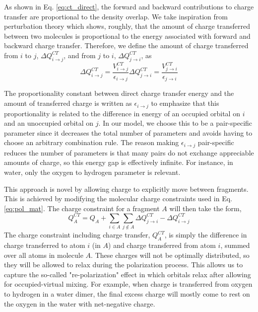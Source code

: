 \documentclass[journal=jacsat,manuscript=article]{achemso}
\begin{document}
As shown in Eq. \ref{eq:ct_direct}, the forward and backward contributions to
charge transfer are proportional to the density overlap.
We take inspiration from perturbation theory which shows, roughly, that
the amount of charge transferred between two molecules is proportional to the
energy associated with forward and backward charge transfer.\cite{khaliullin2007unravelling,khaliullin2008analysis,khaliullin2009electron}
Therefore, we define the amount of charge transferred from $i$ to $j$, $\Delta Q^{CT}_{i\rightarrow j}$,
and from $j$ to $i$, $\Delta Q^{CT}_{j\rightarrow i}$, as
\begin{subequations}
  \begin{equation}
  \Delta Q^{CT}_{i\rightarrow j}=\frac{V^{CT}_{i\rightarrow j}}{\epsilon_{i\rightarrow j}}
\end{equation}
\begin{equation}
  \Delta Q^{CT}_{j\rightarrow i}=\frac{V^{CT}_{j\rightarrow i}}{\epsilon_{j\rightarrow i}}
\end{equation}
\end{subequations}

The proportionality constant between direct charge transfer
energy and the amount of transferred charge is written as $\epsilon_{i\rightarrow j}$
to emphasize that this proportionality is related to the difference in energy
of an occupied orbital on $i$ and an unoccupied orbital on $j$.\cite{khaliullin2007unravelling}
In our model, we choose this to be a pair-specific parameter since it decreases the
total number of parameters and avoids having to choose an arbitrary combination rule.
The reason making $\epsilon_{i\rightarrow j}$ pair-specific reduces the number of parameters
is that many pairs do not exchange appreciable amounts of charge, so this energy gap
is effectively infinite. For instance, in water, only the oxygen to hydrogen parameter is relevant.

This approach is novel by allowing charge to explicitly move between
fragments. This is achieved by modifying the molecular charge constraints used in Eq. \ref{eq:pol_mat}.
The charge constraint for a fragment $A$ will then take the form,
\begin{equation}
  Q^{CT}_A=Q_A+\sum_{i\in A}\sum_{j\notin A}\Delta Q^{CT}_{j\rightarrow i}-\Delta Q^{CT}_{i\rightarrow j}
  \label{eq:charge_constraint}
\end{equation}
The charge constraint including charge transfer, $Q^{CT}_A$, is simply the
difference in charge transferred to atom $i$ (in $A$) and charge transferred from atom
$i$, summed over all atoms in molecule $A$. These charges will not be optimally
distributed, so they will be allowed to relax during the polarization process.
This allows us to capture the so-called "re-polarization"\cite{khaliullin2007unravelling}
effect in which orbitals relax after allowing for occupied-virtual mixing.
For example, when charge is transferred from oxygen to hydrogen in a water
dimer, the final excess charge will mostly come to rest on the oxygen in
the water with net-negative charge.
\end{document}

